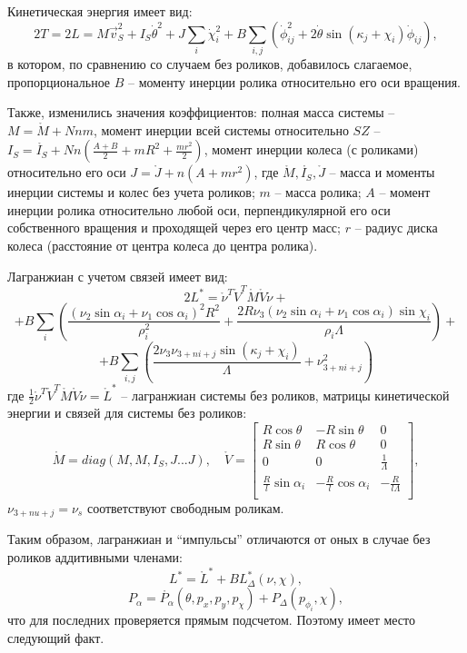 Кинетическая энергия имеет вид:
$$ 2T = 2L = M\vec{v}_S^2 + I_S\dot{\theta}^2 + J\sum_i\dot{\chi}_i^2 + B\sum_{i,j}(\dot{\phi}_{ij}^2 + 2\dot{\theta}\sin(\kappa_j + \chi_i)\dot{\phi}_{ij}),$$
в котором, по сравнению со случаем без роликов, добавилось слагаемое, пропорциональное $B$ -- моменту инерции ролика относительно его оси вращения.

Также, изменились значения коэффициентов: полная масса системы -- $M = \mathring{M} + Nnm$, момент инерции всей системы относительно $SZ$ -- $I_S = \mathring{I_S} + Nn(\frac{A+B}{2} + mR^2 + \frac{mr^2}{2})$, момент инерции колеса (с роликами) относительно его оси $J = \mathring{J} + n(A + mr^2)$, где $\mathring{M}, \mathring{I_S}, \mathring{J}$ -- масса и моменты инерции системы и колес без учета роликов; $m$ -- масса ролика; $A$ -- момент инерции ролика относительно любой оси, перпендикулярной его оси собственного вращения и проходящей через его центр масс; $r$ -- радиус диска колеса (расстояние от центра колеса до центра ролика).

Лагранжиан с учетом связей имеет вид:
$$ 2L^{*} = \mathring{\nu}^T \mathring{V}^T \mathring{M} \mathring{V} \mathring{\nu} + $$
$$ + B\sum_{i}(
	\frac{(\nu_2\sin\alpha_i+\nu_1\cos\alpha_i)^2R^2}
	{\rho_i^2} +
	\frac{2R\nu_3(\nu_2\sin\alpha_i+\nu_1\cos\alpha_i)\sin\chi_i}
	{\rho_i\Lambda}
) + $$
$$+ B\sum_{i,j}(
	\frac{2\nu_3\nu_{3+ni+j}\sin(\kappa_j+\chi_i)}
	{\Lambda}
	+
	\nu_{3+ni+j}^2
)
$$
где $\frac{1}{2}\mathring{\nu}^T \mathring{V}^T \mathring{M} \mathring{V} \mathring{\nu} = \mathring{L}^{*}$ -- лагранжиан системы без роликов, матрицы кинетической энергии и связей для системы без роликов:
$$
\mathring{M} = diag(M, M, I_S, J...J),
\quad
\mathring{V} = \begin{bmatrix}
    R\cos\theta & -R\sin\theta & 0 \\
    R\sin\theta & R\cos\theta  & 0 \\
    0           & 0            & \frac{1}{\Lambda} \\
    \frac{R}{l}\sin\alpha_i & -\frac{R}{l}\cos\alpha_i & -\frac{R}{l\Lambda} \\
\end{bmatrix},
$$
$\nu_{3+nu+j} = \nu_s$ соответствуют свободным роликам.


Таким образом, лагранжиан и ``импульсы'' отличаются от оных в случае без роликов аддитивными членами:
$$ L^{*} = \mathring{L}^{*} + BL^{*}_\Delta(\nu, \chi),$$
$$ P_\alpha = \mathring{P_\alpha}(\theta, p_x, p_y, p_\chi) + P_\Delta(p_{\phi_i}, \chi),$$
что для последних проверяется прямым подсчетом. Поэтому имеет место следующий факт.

